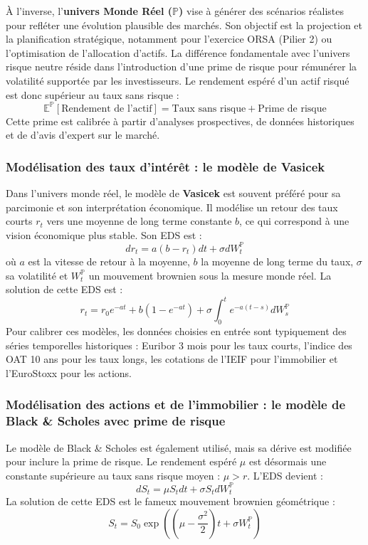À l'inverse, l'\textbf{univers Monde Réel ($\mathbb{P}$)} vise à générer des scénarios réalistes pour refléter une évolution plausible des marchés. Son objectif est la projection et la planification stratégique, notamment pour l'exercice ORSA (Pilier 2) ou l'optimisation de l'allocation d'actifs. La différence fondamentale avec l'univers risque neutre réside dans l'introduction d'une prime de risque pour rémunérer la volatilité supportée par les investisseurs. Le rendement espéré d'un actif risqué est donc supérieur au taux sans risque :
\begin{equation}
    \mathbb{E}^{\mathbb{P}}[\text{Rendement de l'actif}] = \text{Taux sans risque} + \text{Prime de risque}
\end{equation}
Cette prime est calibrée à partir d'analyses prospectives, de données historiques et de d'avis d'expert sur le marché.

\subsubsection{Modélisation des taux d'intérêt : le modèle de Vasicek}
Dans l'univers monde réel, le modèle de \textbf{Vasicek} est souvent préféré pour sa parcimonie et son interprétation économique. Il modélise un retour des taux courts $r_t$ vers une moyenne de long terme constante $b$, ce qui correspond à une vision économique plus stable. Son EDS est :
\begin{equation}
    dr_t = a(b - r_t)dt + \sigma dW^{\mathbb{P}}_t
    \label{eq:vasicek}
\end{equation}
où $a$ est la vitesse de retour à la moyenne, $b$ la moyenne de long terme du taux, $\sigma$ sa volatilité et $W^{\mathbb{P}}_t$ un mouvement brownien sous la mesure monde réel. La solution de cette EDS est :
\begin{equation}
    r_t = r_0 e^{-at} + b(1-e^{-at}) + \sigma \int_0^t e^{-a(t-s)}dW^{\mathbb{P}}_s
\end{equation}
Pour calibrer ces modèles, les données choisies en entrée sont typiquement des séries temporelles historiques : Euribor 3 mois pour les taux courts, l'indice des OAT 10 ans pour les taux longs, les cotations de l'IEIF pour l'immobilier et l'EuroStoxx pour les actions.

\subsubsection{Modélisation des actions et de l'immobilier : le modèle de Black \& Scholes avec prime de risque}
Le modèle de Black \& Scholes est également utilisé, mais sa dérive est modifiée pour inclure la prime de risque. Le rendement espéré $\mu$ est désormais une constante supérieure au taux sans risque moyen : $\mu > r$. L'EDS devient :
\begin{equation}
    dS_t = \mu S_t dt + \sigma S_t dW^{\mathbb{P}}_t
    \label{eq:black_scholes_p}
\end{equation}
La solution de cette EDS est le fameux mouvement brownien géométrique :
\begin{equation}
    S_t = S_0 \exp\left( \left(\mu - \frac{\sigma^2}{2}\right)t + \sigma W^{\mathbb{P}}_t \right)
\end{equation}

